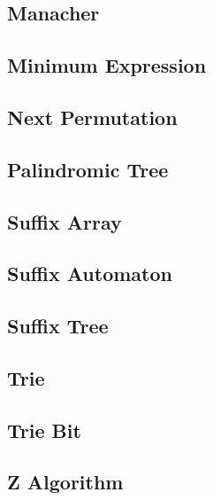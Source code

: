 \subsection{Manacher}
\raggedbottom
\hrulefill
\subsection{Minimum Expression}
\raggedbottom
\hrulefill
\subsection{Next Permutation}
\raggedbottom
\hrulefill
\subsection{Palindromic Tree}
\raggedbottom
\hrulefill
\subsection{Suffix Array}
\raggedbottom
\hrulefill
\subsection{Suffix Automaton}
\raggedbottom
\hrulefill
\subsection{Suffix Tree}
\raggedbottom
\hrulefill
\subsection{Trie}
\raggedbottom
\hrulefill
\subsection{Trie Bit}
\raggedbottom
\hrulefill
\subsection{Z Algorithm}
\raggedbottom
\hrulefill
